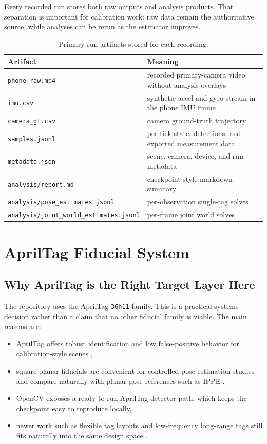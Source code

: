 \documentclass[11pt,a4paper]{article}
\begin{document}
Every recorded run stores both raw outputs and analysis products.
That separation is important for calibration work: raw data remain the authoritative source, while analyses can be rerun as the estimator improves.

\begin{table}[H]
\centering
\caption{Primary run artifacts stored for each recording.}
\label{tab:artifacts}
\begin{tabularx}{\linewidth}{lX}
\toprule
Artifact & Meaning \\
\midrule
\texttt{phone\_raw.mp4} & recorded primary-camera video without analysis overlays \\
\texttt{imu.csv} & synthetic accel and gyro stream in the phone IMU frame \\
\texttt{camera\_gt.csv} & camera ground-truth trajectory \\
\texttt{samples.jsonl} & per-tick state, detections, and exported measurement data \\
\texttt{metadata.json} & scene, camera, device, and run metadata \\
\texttt{analysis/report.md} & checkpoint-style markdown summary \\
\texttt{analysis/pose\_estimates.jsonl} & per-observation single-tag solves \\
\texttt{analysis/joint\_world\_estimates.jsonl} & per-frame joint world solves \\
\bottomrule
\end{tabularx}
\end{table}

\section{AprilTag Fiducial System}

\subsection{Why AprilTag is the Right Target Layer Here}

The repository uses the AprilTag \texttt{36h11} family.
This is a practical systems decision rather than a claim that no other fiducial family is viable.
The main reasons are:

\begin{itemize}
  \item AprilTag offers robust identification and low false-positive behavior for calibration-style scenes \citep{olson2011apriltag,wang2016apriltag2},
  \item square planar fiducials are convenient for controlled pose-estimation studies and compare naturally with planar-pose references such as IPPE \citep{collins2014ippe},
  \item OpenCV exposes a ready-to-run AprilTag detector path, which keeps the checkpoint easy to reproduce locally,
  \item newer work such as flexible tag layouts and low-frequency long-range tags still fits naturally into the same design space \citep{krogius2019flexible,wang2020lftag}.
\end{itemize}
\end{document}
